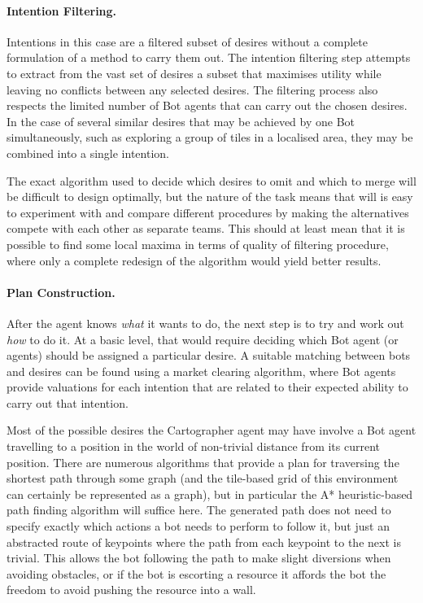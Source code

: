 \documentclass[a4paper,10pt]{article}
\begin{document}
\paragraph{Intention Filtering.}
Intentions in this case are a filtered subset of desires without a complete formulation of a method to carry them out. The intention filtering step attempts to extract from the vast set of desires a subset that maximises utility while leaving no conflicts between any selected desires. The filtering process also respects the limited number of Bot agents that can carry out the chosen desires. In the case of several similar desires that may be achieved by one Bot simultaneously, such as exploring a group of tiles in a localised area, they may be combined into a single intention.

The exact algorithm used to decide which desires to omit and which to merge will be difficult to design optimally, but the nature of the task means that will is easy to experiment with and compare different procedures by making the alternatives compete with each other as separate teams. This should at least mean that it is possible to find some local maxima in terms of quality of filtering procedure, where only a complete redesign of the algorithm would yield better results.

\paragraph{Plan Construction.}
After the agent knows \emph{what} it wants to do, the next step is to try and work out \emph{how} to do it. At a basic level, that would require deciding which Bot agent (or agents) should be assigned a particular desire. A suitable matching between bots and desires can be found using a market clearing algorithm\cite{easley10}, where Bot agents provide valuations for each intention that are related to their expected ability to carry out that intention.

Most of the possible desires the Cartographer agent may have involve a Bot agent travelling to a position in the world of non-trivial distance from its current position. There are numerous algorithms that provide a plan for traversing the shortest path through some graph (and the tile-based grid of this environment can certainly be represented as a graph), but in particular the A* heuristic-based path finding algorithm\cite{hart68} will suffice here. The generated path does not need to specify exactly which actions a bot needs to perform to follow it, but just an abstracted route of keypoints where the path from each keypoint to the next is trivial. This allows the bot following the path to make slight diversions when avoiding obstacles, or if the bot is escorting a resource it affords the bot the freedom to avoid pushing the resource into a wall.
\end{document}
